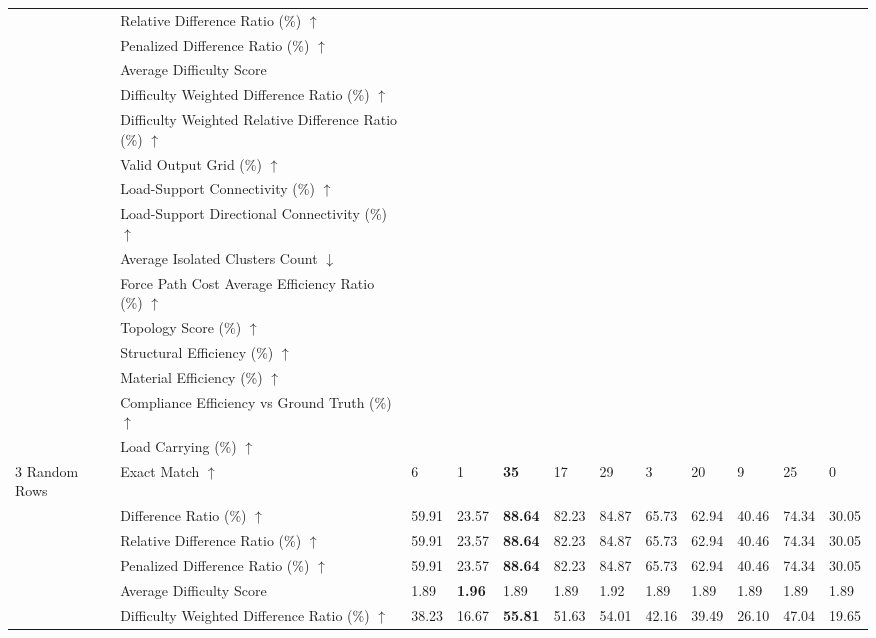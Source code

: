 \begin{table}[!h]
{\begin{tabular}{llllllllllll}
 & Relative Difference Ratio (\%) $\uparrow$ &  &  &  &  &  &  &  &  &  &  \\
 & Penalized Difference Ratio (\%) $\uparrow$ &  &  &  &  &  &  &  &  &  &  \\
 & Average Difficulty Score &  &  &  &  &  &  &  &  &  &  \\
 & Difficulty Weighted Difference Ratio (\%) $\uparrow$ &  &  &  &  &  &  &  &  &  &  \\
 & Difficulty Weighted Relative Difference Ratio (\%) $\uparrow$ &  &  &  &  &  &  &  &  &  &  \\
 & Valid Output Grid (\%) $\uparrow$ &  &  &  &  &  &  &  &  &  &  \\
 & Load-Support Connectivity (\%) $\uparrow$ &  &  &  &  &  &  &  &  &  &  \\
 & Load-Support Directional Connectivity (\%) $\uparrow$ &  &  &  &  &  &  &  &  &  &  \\
 & Average Isolated Clusters Count $\downarrow$ &  &  &  &  &  &  &  &  &  &  \\
 & Force Path Cost Average Efficiency Ratio (\%) $\uparrow$ &  &  &  &  &  &  &  &  &  &  \\
 & Topology Score (\%) $\uparrow$ &  &  &  &  &  &  &  &  &  &  \\
 & Structural Efficiency (\%) $\uparrow$ &  &  &  &  &  &  &  &  &  &  \\
 & Material Efficiency (\%) $\uparrow$ &  &  &  &  &  &  &  &  &  &  \\
 & Compliance Efficiency vs Ground Truth (\%) $\uparrow$ &  &  &  &  &  &  &  &  &  &  \\
 & Load Carrying (\%) $\uparrow$ &  &  &  &  &  &  &  &  &  &  \\
3 Random Rows & Exact Match $\uparrow$ & 6 & 1 & \textbf{35} & 17 & 29 & 3 & 20 & 9 & 25 & 0 \\
 & Difference Ratio (\%) $\uparrow$ & 59.91 & 23.57 & \textbf{88.64} & 82.23 & 84.87 & 65.73 & 62.94 & 40.46 & 74.34 & 30.05 \\
 & Relative Difference Ratio (\%) $\uparrow$ & 59.91 & 23.57 & \textbf{88.64} & 82.23 & 84.87 & 65.73 & 62.94 & 40.46 & 74.34 & 30.05 \\
 & Penalized Difference Ratio (\%) $\uparrow$ & 59.91 & 23.57 & \textbf{88.64} & 82.23 & 84.87 & 65.73 & 62.94 & 40.46 & 74.34 & 30.05 \\
 & Average Difficulty Score & 1.89 & \textbf{1.96} & 1.89 & 1.89 & 1.92 & 1.89 & 1.89 & 1.89 & 1.89 & 1.89 \\
 & Difficulty Weighted Difference Ratio (\%) $\uparrow$ & 38.23 & 16.67 & \textbf{55.81} & 51.63 & 54.01 & 42.16 & 39.49 & 26.10 & 47.04 & 19.65 \\

\end{tabular}}
\end{table}
